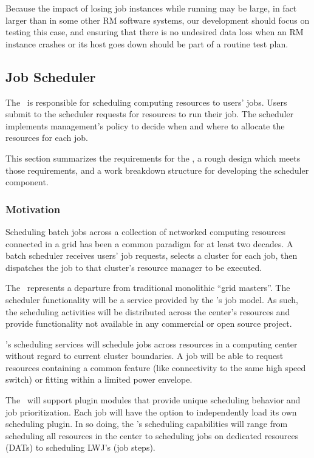 Because the impact of losing job instances while running may be
large, in fact larger than in some other RM software systems,
our development should focus on testing this case, and ensuring
that there is no undesired data loss when an RM instance crashes
or its host goes down should be part of a routine test plan.


\subsection{Job Scheduler}

The \ngjs\ is responsible for scheduling computing resources to users'
jobs.  Users submit to the scheduler requests for resources to run
their job.  The scheduler implements management's policy to decide
when and where to allocate the resources for each job.

This section summarizes the requirements for the \ngjs, a rough design
which meets those requirements, and a work breakdown structure for
developing the scheduler component.

\subsubsection{Motivation}

Scheduling batch jobs across a collection of networked computing
resources connected in a grid has been a common paradigm for at least
two decades.  A batch scheduler receives users' job requests, selects
a cluster for each job, then dispatches the job to that cluster's
resource manager to be executed.

The \ngjs\ represents a departure from traditional monolithic ``grid
masters''.  The scheduler functionality will be a service provided by
the \ngrm's job model.  As such, the scheduling activities will be
distributed across the center's resources and provide functionality
not available in any commercial or open source project.

\ngjs's scheduling services will schedule jobs across resources in a
computing center without regard to current cluster boundaries.  A job
will be able to request resources containing a common feature (like
connectivity to the same high speed switch) or fitting within a
limited power envelope.

The \ngjs\ will support plugin modules that provide unique scheduling
behavior and job prioritization.  Each job will have the option to
independently load its own scheduling plugin.  In so doing, the
\ngjs's scheduling capabilities will range from scheduling all
resources in the center to scheduling jobs on dedicated resources
(DATs) to scheduling LWJ's (job steps).

